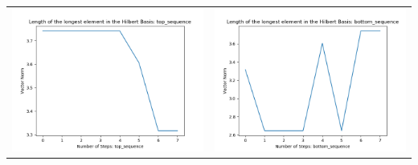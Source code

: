 \documentclass[10pt]{article}
\begin{document}
\begin{tabular}{c|c}
\begin{minipage}{.45\textwidth}
\includegraphics[width=\textwidth]{"DATA/4d/4 generators 2 bound E/top_sequence LENGTH"}
\end{minipage} &
\begin{minipage}{.45\textwidth}
\includegraphics[width=\textwidth]{"DATA/4d/4 generators 2 bound E bottomup/bottom_sequence LENGTH"}
\end{minipage}
\end{tabular}
\end{document}
